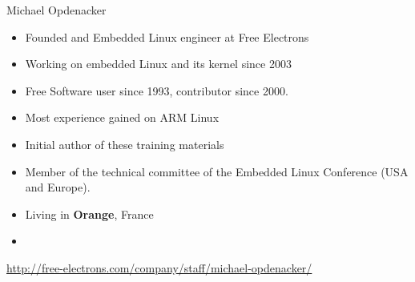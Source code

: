 \begin{frame}{Michael Opdenacker}
    \begin{itemize}
	\item Founded and Embedded Linux engineer at Free Electrons
	\item Working on embedded Linux and its kernel since 2003
	\item Free Software user since 1993, contributor since 2000.
	\item Most experience gained on ARM Linux
	\item Initial author of these training materials
	\item Member of the technical committee of the Embedded Linux
	      Conference (USA and Europe).
	\item Living in {\bf Orange}, France
	\item {}
    \end{itemize}
    {\small \url{http://free-electrons.com/company/staff/michael-opdenacker/}}
\end{frame}
